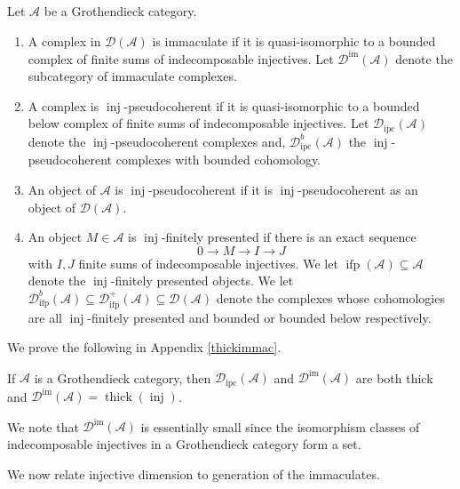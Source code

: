 \documentclass[12pt,oneside]{amsart}
\DeclareMathOperator{\thick}{thick}
\DeclareMathOperator{\inj}{inj}
\DeclareMathOperator{\immac}{im}
\DeclareMathOperator{\ipscoh}{ipc}
\DeclareMathOperator{\ifp}{ifp}
\begin{document}
\begin{defn} \label{immacdefn}Let $\mathcal{A}$ be a Grothendieck category.
\begin{enumerate}
\item A complex in $\mathcal{D}(\mathcal{A})$ is immaculate if it is quasi-isomorphic to a bounded complex of finite sums of indecomposable injectives. Let $\mathcal{D}^{\immac}(\mathcal{A})$ denote the  subcategory of immaculate complexes.

\item A complex is $\inj$-pseudocoherent if it is quasi-isomorphic to a bounded below complex of finite sums of indecomposable injectives. Let $\mathcal{D}_{\ipscoh}(\mathcal{A})$ denote the $\inj$-pseudocoherent complexes and, $\mathcal{D}_{\ipscoh}^b(\mathcal{A})$ the $\inj$-pseudocoherent complexes with bounded cohomology.

\item An object of $\mathcal{A}$ is $\inj$-pseudocoherent if it is $\inj$-pseudocoherent as an object of $\mathcal{D}(\mathcal{A})$. 

\item An object  $M \in \mathcal{A}$ is $\inj$-finitely presented if there is an exact sequence
\[
0 \to M \to I \to J 
\]
with $I,J$ finite sums of indecomposable injectives. We let $\ifp(\mathcal{A}) \subseteq \mathcal{A}$ denote the $\inj$-finitely presented objects. We let $\mathcal{D}^b_{\ifp}(\mathcal{A}) \subseteq \mathcal{D}^+_{\ifp}(\mathcal{A}) \subseteq \mathcal{D}(\mathcal{A})$ denote the complexes whose cohomologies are all $\inj$-finitely presented and bounded or bounded below respectively.
\end{enumerate}
\end{defn}

We prove the following in Appendix \ref{thickimmac}.

\begin{prop} \label{thingsarethick}
If $\mathcal{A}$ is a Grothendieck category, then $\mathcal{D}_{\ipscoh}(\mathcal{A})$ and $\mathcal{D}^{\immac}(\mathcal{A})$ are both thick and $\mathcal{D}^{\immac}(\mathcal{A}) = \thick(\inj)$. 
\end{prop}


\begin{remark}
We note that $\mathcal{D}^{\immac}(\mathcal{A})$ is essentially small since the isomorphism classes of indecomposable injectives in a Grothendieck category form a set. 
\end{remark}

We now relate injective dimension to generation of the immaculates. 
\end{document}
